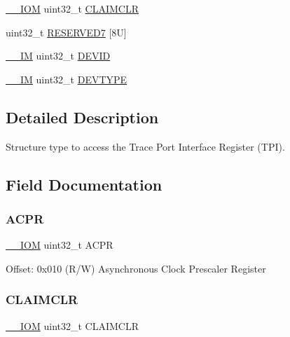 \begin{DoxyCompactItemize}
\item 
\mbox{\hyperlink{core__cm4_8h_ab6caba5853a60a17e8e04499b52bf691}{\+\_\+\+\_\+\+I\+OM}} uint32\+\_\+t \mbox{\hyperlink{struct_t_p_i___type_a1f74caab7b0a7afa848c63ce8ebc6a6f}{C\+L\+A\+I\+M\+C\+LR}}
\item 
uint32\+\_\+t \mbox{\hyperlink{struct_t_p_i___type_a49f51f1c090eb2cda74363bbfc3b385b}{R\+E\+S\+E\+R\+V\+E\+D7}} \mbox{[}8\+U\mbox{]}
\item 
\mbox{\hyperlink{core__cm4_8h_a4cc1649793116d7c2d8afce7a4ffce43}{\+\_\+\+\_\+\+IM}} uint32\+\_\+t \mbox{\hyperlink{struct_t_p_i___type_aaed316dacef669454fa035e04ee90eca}{D\+E\+V\+ID}}
\item 
\mbox{\hyperlink{core__cm4_8h_a4cc1649793116d7c2d8afce7a4ffce43}{\+\_\+\+\_\+\+IM}} uint32\+\_\+t \mbox{\hyperlink{struct_t_p_i___type_a81f643aff0e4bed2638a618e2b1fd3bb}{D\+E\+V\+T\+Y\+PE}}
\end{DoxyCompactItemize}


\subsection{Detailed Description}
Structure type to access the Trace Port Interface Register (T\+PI). 

\subsection{Field Documentation}
\mbox{\label{struct_t_p_i___type_a49a770cf0b7ec970f919f8ac22634fff}} 
\subsubsection{\texorpdfstring{A\+C\+PR}{ACPR}}
{\footnotesize\ttfamily \mbox{\hyperlink{core__cm4_8h_ab6caba5853a60a17e8e04499b52bf691}{\+\_\+\+\_\+\+I\+OM}} uint32\+\_\+t A\+C\+PR}

Offset\+: 0x010 (R/W) Asynchronous Clock Prescaler Register \mbox{\label{struct_t_p_i___type_a1f74caab7b0a7afa848c63ce8ebc6a6f}} 
\subsubsection{\texorpdfstring{C\+L\+A\+I\+M\+C\+LR}{CLAIMCLR}}
{\footnotesize\ttfamily \mbox{\hyperlink{core__cm4_8h_ab6caba5853a60a17e8e04499b52bf691}{\+\_\+\+\_\+\+I\+OM}} uint32\+\_\+t C\+L\+A\+I\+M\+C\+LR}

